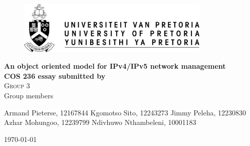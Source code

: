 \begin{titlepage}
	\begin{center}
		
		\begin{figure}[t]
			\centering
			\includegraphics[width=350px]{images/up-logo.jpg}
		\end{figure}
		
		\textbf{\Huge An object oriented model for IPv4/IPv5 network management} \\ 
		\vspace{2cm}
		\textbf{\large COS 236 essay submitted by} \\ 
		\textsc{\large Group 3} \\ 
		\vspace{2cm}
		\large Group members \\ 
		
		\begin{flushright} \large
			Armand Pieterse, 12167844 \newline
			Kgomotso Sito, 12243273 \newline
			Jimmy Peleha, 12230830 \newline
			Azhar Mohungoo, 12239799 \newline
			Ndivhuwo Nthambeleni, 10001183 \newline
			\end{flushright}
		\textsc{\large \today}
		
		\vfill
		
	\vfill
	\end{center}
\end{titlepage}
